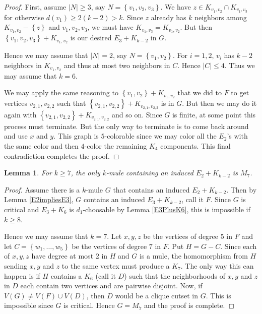 \documentclass[12pt]{article}
\theoremstyle{plain}
\newtheorem{lem}[thm]{Lemma}
\theoremstyle{definition}
\theoremstyle{remark}
\newcommand{\set}[1]{\left\{ #1 \right\}}
\newcommand{\card}[1]{\left|#1\right|}
\begin{document}
\begin{proof}
First, assume $\card{N} \geq 3$, say $N = \set{v_1, v_2, v_3}$.  We have $z \in K_{v_1, v_2} \cap K_{v_1, v_3}$ for otherwise $d(v_1) \geq 2(k - 2) > k$.  Since $z$ already has $k$ neighbors among $K_{v_1, v_2} - \set{z}$ and $v_1, v_2, v_3$, we must have $K_{v_1, v_3} = K_{v_1, v_2}$.  But then $\set{v_1, v_2, v_3} + K_{v_1, v_2}$ is our desired $E_3 + K_{k - 2}$ in $G$.\newline

Hence we may assume that $\card{N} = 2$, say $N = \set{v_1, v_2}$.  For $i = 1,2$, $v_i$ has $k - 2$ neighbors in $K_{v_1, v_2}$ and thus at most two neighbors in $C$.  Hence $\card{C} \leq 4$.  Thus we may assume that $k = 6$.\newline

We may apply the same reasoning to $\set{v_1, v_2} + K_{v_1, v_2}$ that we did to $F$ to get vertices $v_{2,1}, v_{2,2}$ such that $\set{v_{2,1}, v_{2,2}} +  K_{v_{2,1}, v_{2,2}}$ is in $G$.  But then we may do it again with $\set{v_{2,1}, v_{2,2}} +  K_{v_{2,1}, v_{2,2}}$ and so on.  Since $G$ is finite, at some point this process must terminate. But the only way to terminate is to come back around and use $x$ and $y$.  This graph is $5$-colorable since we may color all the $E_2$'s with the same color and then $4$-color the remaining $K_4$ components.  This final contradiction completes the proof.
\end{proof}

\begin{lem}\label{NoE2}
For $k \geq 7$, the only $k$-mule containing an induced $E_2 + K_{k - 2}$ is $M_7$.
\end{lem}
\begin{proof}
Assume there is a $k$-mule $G$ that contains an induced $E_2 + K_{k - 2}$. Then by Lemma \ref{E2impliesE3}, $G$ contains an induced $E_3 + K_{k - 2}$, call it $F$. Since $G$ is critical and $E_3 + K_6$ is $d_1$-choosable by Lemma \ref{E3PlusK6}, this is impossible if $k \geq 8$.\newline

Hence we may assume that $k = 7$.  Let $x, y, z$ be the vertices of degree $5$ in $F$ and let $C = \set{w_1, \ldots, w_{5}}$ be the vertices of degree $7$ in $F$. Put $H = G - C$.  Since each of $x, y, z$ have degree at most $2$ in $H$ and $G$ is a mule, the homomorphism from $H$ sending $x, y$ and $z$ to the same vertex must produce a $K_7$.  The only way this can happen is if $H$ contains a $K_6$ (call it $D$) such that the neighborhoods of $x, y$ and $z$ in $D$ each contain two vertices and are pairwise disjoint.  Now, if $V(G) \neq V(F) \cup V(D)$, then $D$ would be a clique cutset in $G$.  This is impossible since $G$ is critical.  Hence $G = M_7$ and the proof is complete.
\end{proof}
\end{document}
